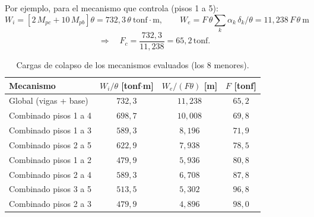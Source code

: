 \documentclass[11pt,letterpaper]{article}
\newcommand{\tonf}{\,\mathrm{tonf}}
\begin{document}
Por ejemplo, para el mecanismo que controla (pisos 1 a 5):
\[
W_i = \left[2\,M_{pc} + 10\,M_{pb}\right]\theta
     = 732{,}3\,\theta \ \mathrm{tonf\cdot m},
\qquad
W_e = F\,\theta\sum_k \alpha_k\,\delta_k/\theta = 11{,}238\,F\,\theta\ \mathrm{m}
\]
\[
\Rightarrow\quad F_c = \frac{732{,}3}{11{,}238} = 65{,}2\tonf .
\]

\begin{table}[H]
\centering
\caption{Cargas de colapso de los mecanismos evaluados (los 8 menores).}
\begin{tabular}{lccc}
\toprule
Mecanismo & $W_i/\theta$ [tonf$\cdot$m] & $W_e/(F\theta)$ [m] & $F$ [tonf] \\
\midrule
Global (vigas + base) & $732{,}3$ & $11{,}238$ & $65{,}2$ \\
Combinado pisos 1 a 4 & $698{,}7$ & $10{,}008$ & $69{,}8$ \\
Combinado pisos 1 a 3 & $589{,}3$ & $8{,}196$ & $71{,}9$ \\
Combinado pisos 2 a 5 & $622{,}9$ & $7{,}938$ & $78{,}5$ \\
Combinado pisos 1 a 2 & $479{,}9$ & $5{,}936$ & $80{,}8$ \\
Combinado pisos 2 a 4 & $589{,}3$ & $6{,}708$ & $87{,}8$ \\
Combinado pisos 3 a 5 & $513{,}5$ & $5{,}302$ & $96{,}8$ \\
Combinado pisos 2 a 3 & $479{,}9$ & $4{,}896$ & $98{,}0$ \\
\bottomrule
\end{tabular}
\end{table}
\end{document}
